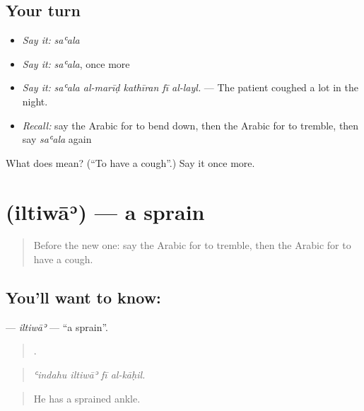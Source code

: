 \subsection*{Your turn}
\begin{itemize}
\raggedright
  \item \emph{Say it:} \emph{saʿala}
  \item \emph{Say it:} \emph{saʿala}, once more
  \item \emph{Say it:} \emph{saʿala al-marīḍ kathīran fī al-layl.} — The patient coughed a lot in the night.
  \item \emph{Recall:} say the Arabic for to bend down, then the Arabic for to tremble, then say \emph{saʿala} again
\end{itemize}

\begin{tcolorbox}[breakable,colback=teal!4,colframe=teal!35!black,title={Before you move on}]
What does  mean? (\textquotedblleft{}To have a cough\textquotedblright{}.) Say it once more.
\end{tcolorbox}
\section[\texorpdfstring{\ar{التواء} (iltiwāʾ)}{التواء (iltiwāʾ)}]{ (iltiwāʾ) — a sprain}

\label{lesson:AR-C516-iltiwa}



\begin{quote}
Before the new one: say the Arabic for to tremble, then the Arabic for to have a cough.
\end{quote}

\subsection*{You'll want to know: }
\textbf{} — \emph{iltiwāʾ} — \textquotedblleft{}a sprain\textquotedblright{}.

\begin{quote}
   .
\end{quote}

\begin{quote}
\emph{ʿindahu iltiwāʾ fī al-kāḥil.}
\end{quote}

\begin{quote}
He has a sprained ankle.
\end{quote}

